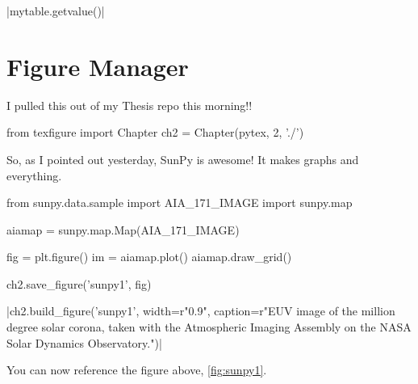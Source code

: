 \documentclass[]{article}
\begin{document}
\py|mytable.getvalue()|


\section{Figure Manager}

I pulled this out of my Thesis repo this morning!!

\begin{pycode}[chapter2]
from texfigure import Chapter
ch2 = Chapter(pytex, 2, './')
\end{pycode}

So, as I pointed out yesterday, SunPy is awesome! It makes graphs and everything.

\begin{pycode}[chapter2]
from sunpy.data.sample import AIA_171_IMAGE
import sunpy.map

aiamap = sunpy.map.Map(AIA_171_IMAGE)

fig = plt.figure()
im = aiamap.plot()
aiamap.draw_grid()

ch2.save_figure('sunpy1', fig)
\end{pycode}

\py[chapter2]|ch2.build_figure('sunpy1',
width=r"0.9\columnwidth",
caption=r"EUV image of the million degree solar corona, taken with the Atmospheric Imaging Assembly on the NASA Solar Dynamics Observatory.")|

You can now reference the figure above, \ref{fig:sunpy1}.
\end{document}
